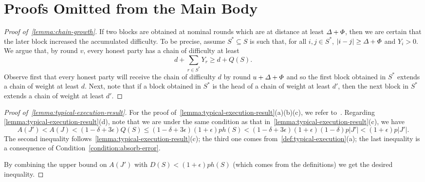 \section{Proofs Omitted from the Main Body}
\label{sec:proofs-omitted}

\begin{proof}[Proof of~\cref{lemma:chain-growth}]
    If two blocks are obtained at nominal rounds which are at distance at least $\varDelta + \varPhi$, then we are certain that the later block increased the accumulated difficulty.
    To be precise, assume $S^* \subseteq S$ is such that, for all $i, j \in S^*$, $|i - j| \ge \varDelta + \varPhi$ and $Y_i > 0$.
    We argue that, by round $v$, every honest party has a chain of difficulty at least
    \[ d + \sum_{r \in S^*} Y_r \ge d + Q(S). \]
    Observe first that every honest party will receive the chain of difficulty $d$ by round $u + \varDelta + \varPhi$ and so the first block obtained in $S^*$ extends a chain of weight at least $d$.
    Next, note that if a block obtained in $S^*$ is the head of a chain of weight at least $d'$, then the next block in $S^*$ extends a chain of weight at least $d'$.
\end{proof}

\begin{proof}[Proof of~\cref{lemma:typical-execution-result}]
    For the proof of~\cref{lemma:typical-execution-result}(a)(b)(c), we refer to~\cite{EPRINT:GarKiaLeo20}.
    Regarding \cref{lemma:typical-execution-result}(d), note that we are under the same condition as that in~\cref{lemma:typical-execution-result}(c), we have
    \[ A(J') < A(J) < (1 - \delta + 3\epsilon) Q(S) \le (1 - \delta + 3\epsilon) (1 + \epsilon) p h(S) < (1 - \delta + 3\epsilon) (1 + \epsilon) (1 - \delta) p |J'| < (1 + \epsilon) p |J'|. \]
    The second inequality follows~\cref{lemma:typical-execution-result}(c); the third one comes from~\cref{def:typical-execution}(a); the last inequality is a consequence of Condition~\eqref{condition:absorb-error}.

    By combining the upper bound on $A(J')$ with $D(S) < (1 + \epsilon) p h(S)$ (which comes from the definitions) we get the desired inequality.
\end{proof}

